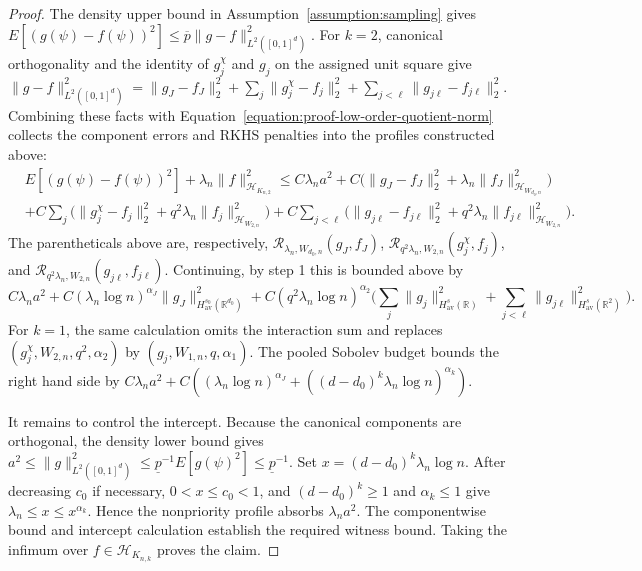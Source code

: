 \documentclass[letterpaper,12pt]{article}
\theoremstyle{definition}
\numberwithin{equation}{section}
\newcommand{\mr}{\mathbb{R}}
\newcommand{\mc}{\mathcal}
\newcommand{\norm}[1]{\lVert#1\rVert}
\begin{document}
\begin{proof}
The density upper bound in Assumption~\ref{assumption:sampling} gives $E[(g(\psi)-f(\psi))^2]\leq\overline p\norm{g-f}_{L^2([0,1]^d)}^2$.
For $k=2$, canonical orthogonality and the identity of $g_j^\chi$ and $g_j$ on the assigned unit square give $\norm{g-f}_{L^2([0,1]^d)}^2=\norm{g_J-f_J}_2^2+\sum_j\norm{g_j^\chi-f_j}_2^2+\sum_{j<\ell}\norm{g_{j\ell}-f_{j\ell}}_2^2$.
Combining these facts with Equation~\eqref{equation:proof-low-order-quotient-norm} collects the component errors and RKHS penalties into the profiles constructed above:
\begin{align*}
&E[(g(\psi)-f(\psi))^2]+\lambda_n\norm{f}_{\mc H_{K_{n,2}}}^2\leq C\lambda_n a^2+C\big(\norm{g_J-f_J}_2^2+\lambda_n\norm{f_J}_{\mc H_{W_{d_0,n}}}^2\big)\\
&+C\sum_j\big(\norm{g_j^\chi-f_j}_2^2+q^2\lambda_n\norm{f_j}_{\mc H_{W_{2,n}}}^2\big)+C\sum_{j<\ell}\big(\norm{g_{j\ell}-f_{j\ell}}_2^2+q^2\lambda_n\norm{f_{j\ell}}_{\mc H_{W_{2,n}}}^2\big).
\end{align*}
The parentheticals above are, respectively, $\mathcal R_{\lambda_n,W_{d_0,n}}(g_J,f_J)$, $\mathcal R_{q^2\lambda_n,W_{2,n}}(g_j^\chi,f_j)$, and $\mathcal R_{q^2\lambda_n,W_{2,n}}(g_{j\ell},f_{j\ell})$.
Continuing, by step 1 this is bounded above by
\begin{equation*}
C\lambda_n a^2+C(\lambda_n\log n)^{\alpha_J}\norm{g_J}_{H_{\mathrm{av}}^{s_0}(\mr^{d_0})}^2+C(q^2\lambda_n\log n)^{\alpha_2}\bigg(\sum_j\norm{g_j}_{H_{\mathrm{av}}^s(\mr)}^2+\sum_{j<\ell}\norm{g_{j\ell}}_{H_{\mathrm{av}}^s(\mr^2)}^2\bigg).
\end{equation*}
For $k=1$, the same calculation omits the interaction sum and replaces $(g_j^\chi,W_{2,n},q^2,\alpha_2)$ by $(g_j,W_{1,n},q,\alpha_1)$.
The pooled Sobolev budget bounds the right hand side by $C\lambda_n a^2+C((\lambda_n\log n)^{\alpha_J}+((d-d_0)^k\lambda_n\log n)^{\alpha_k})$.

It remains to control the intercept.
Because the canonical components are orthogonal, the density lower bound gives $a^2\leq\norm{g}_{L^2([0,1]^d)}^2\leq\underline p^{-1}E[g(\psi)^2]\leq\underline p^{-1}$.
Set $x=(d-d_0)^k\lambda_n\log n$.
After decreasing $c_0$ if necessary, $0<x\leq c_0<1$, and $(d-d_0)^k\geq1$ and $\alpha_k\leq1$ give $\lambda_n\leq x\leq x^{\alpha_k}$.
Hence the nonpriority profile absorbs $\lambda_n a^2$.
The componentwise bound and intercept calculation establish the required witness bound.
Taking the infimum over $f\in\mc H_{K_{n,k}}$ proves the claim.
\end{proof}
\end{document}
